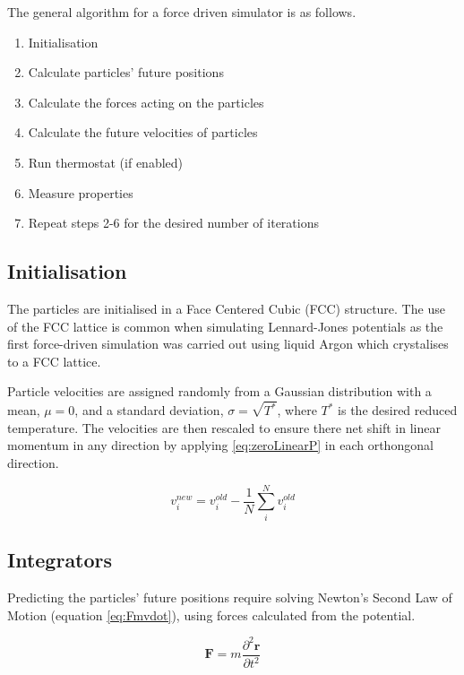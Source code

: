 \message{ !name(main.tex)}\documentclass[12pt]{UoAthesis}
\begin{document}
The general algorithm for a force driven simulator is as follows. 
\begin{flushleft}
  \begin{enumerate} 
  \item Initialisation 
  \item Calculate particles' future positions 
  \item Calculate the forces acting on the particles 
  \item Calculate the future velocities of particles 
  \item Run thermostat (if enabled) 
  \item Measure properties 
  \item Repeat steps 2-6 for the desired number of iterations
  \end{enumerate} 
\end{flushleft}

\subsection{Initialisation \label{sec:initMD}} The particles are initialised in a Face Centered
Cubic (FCC)  structure. The
use of the FCC lattice is common when simulating Lennard-Jones
potentials as the first force-driven simulation \cite{Rahman1964} was
carried out using liquid Argon which crystalises to a FCC lattice.

Particle velocities are assigned randomly from a Gaussian distribution
with a mean, $\mu = 0$, and a standard deviation, $\sigma =
\sqrt{T^{*}}$, where $T^{*}$ is the desired reduced temperature. The
velocities are then rescaled to ensure there net shift in linear
momentum in any direction by applying \eqref{eq:zeroLinearP} in each
orthongonal direction.

\begin{equation} 
  v_{i}^{new} = v_{i}^{old} - \frac{1}{N}
  \sum^{N}_{i}v_{i}^{old}
  \label{eq:zeroLinearP} 
\end{equation}

\subsection{Integrators} 

Predicting the particles' future positions require solving Newton's
Second Law of Motion (equation \ref{eq:Fmvdot}), using forces
calculated from the potential.

\begin{equation} 
  \mathbf{F} = m \frac{\partial^2 \mathbf{r}}{\partial t^2}
  \label{eq:Fmvdot} 
\end{equation}
\end{document}
